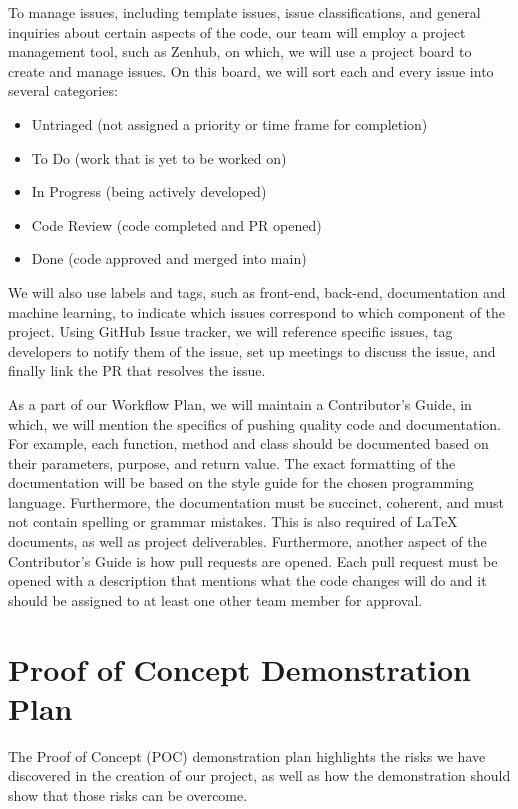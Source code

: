 \documentclass[12pt,letterpaper]{article}
\begin{document}
To manage issues, including template issues, issue classifications, and general
inquiries about certain aspects of the code, our team will employ a project
management tool, such as Zenhub, on which, we will use a project board to create
and manage issues. On this board, we will sort each and every issue into several
categories:
\begin{itemize}
    \item Untriaged (not assigned a priority or time frame for completion) \item
    To Do (work that is yet to be worked on)
    \item In Progress (being actively developed)
    \item Code Review (code completed and PR opened)
    \item Done (code approved and merged into main)
\end{itemize}

We will also use labels and tags, such as front-end, back-end, documentation and
machine learning, to indicate which issues correspond to which component of the
project. Using GitHub Issue tracker, we will reference specific issues, tag
developers to notify them of the issue, set up meetings to discuss the issue,
and finally link the PR that resolves the issue.

As a part of our Workflow Plan, we will maintain a Contributor's Guide, in
which, we will mention the specifics of pushing quality code and documentation.
For example, each function, method and class should be documented based on their
parameters, purpose, and return value. The exact formatting of the documentation
will be based on the style guide for the chosen programming language.
Furthermore, the documentation must be succinct, coherent, and must not contain
spelling or grammar mistakes. This is also required of LaTeX documents, as well
as project deliverables. Furthermore, another aspect of the Contributor's Guide
is how pull requests are opened. Each pull request must be opened with a
description that mentions what the code changes will do and it should be
assigned to at least one other team member for approval.

\section{Proof of Concept Demonstration Plan}

The Proof of Concept (POC) demonstration plan highlights the risks we have
discovered in the creation of our project, as well as how the demonstration
should show that those risks can be overcome.
\end{document}
